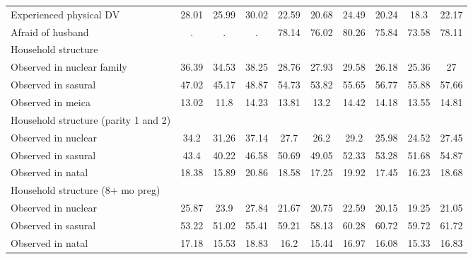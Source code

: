 \begin{tabular}{l*{9}{c}}
Experienced physical DV&       28.01&       25.99&       30.02&       22.59&       20.68&       24.49&       20.24&        18.3&       22.17\\
Afraid of husband   &           .&           .&           .&       78.14&       76.02&       80.26&       75.84&       73.58&       78.11\\
\midrule
Household structure &            &            &            &            &            &            &            &            &            \\
Observed in nuclear family&       36.39&       34.53&       38.25&       28.76&       27.93&       29.58&       26.18&       25.36&          27\\
Observed in sasural &       47.02&       45.17&       48.87&       54.73&       53.82&       55.65&       56.77&       55.88&       57.66\\
Observed in meica   &       13.02&        11.8&       14.23&       13.81&        13.2&       14.42&       14.18&       13.55&       14.81\\
\midrule
Household structure (parity 1 and 2)&            &            &            &            &            &            &            &            &            \\
Observed in nuclear &        34.2&       31.26&       37.14&        27.7&        26.2&        29.2&       25.98&       24.52&       27.45\\
Observed in sasural &        43.4&       40.22&       46.58&       50.69&       49.05&       52.33&       53.28&       51.68&       54.87\\
Observed in natal   &       18.38&       15.89&       20.86&       18.58&       17.25&       19.92&       17.45&       16.23&       18.68\\
\midrule
Household structure (8+ mo preg)&            &            &            &            &            &            &            &            &            \\
Observed in nuclear &       25.87&        23.9&       27.84&       21.67&       20.75&       22.59&       20.15&       19.25&       21.05\\
Observed in sasural &       53.22&       51.02&       55.41&       59.21&       58.13&       60.28&       60.72&       59.72&       61.72\\
Observed in natal   &       17.18&       15.53&       18.83&        16.2&       15.44&       16.97&       16.08&       15.33&       16.83\\
\bottomrule
\end{tabular}
